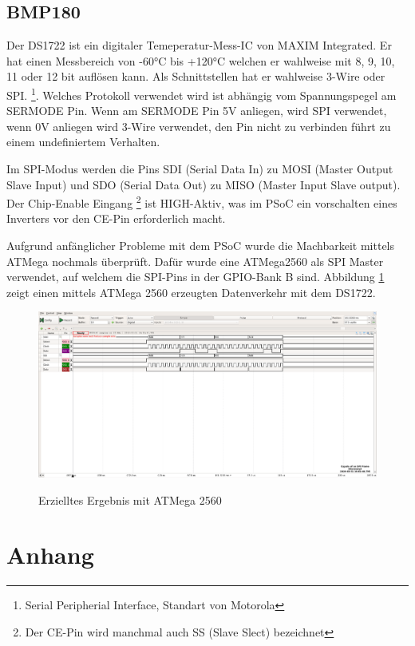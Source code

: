 \documentclass[12pt,a4paper]{article}
\begin{document}
	
\subsection{BMP180}

	Der DS1722 ist ein digitaler Temeperatur-Mess-IC von MAXIM Integrated.
	Er hat einen Messbereich von -60°C bis +120°C welchen er wahlweise mit
	8, 9, 10, 11 oder 12 bit auflösen kann. Als Schnittstellen hat er
	wahlweise 3-Wire oder SPI.
	\footnote{Serial Peripherial Interface, Standart von Motorola}. Welches
	Protokoll verwendet wird ist abhängig vom Spannungspegel am SERMODE
	Pin. Wenn am SERMODE Pin 5V anliegen, wird SPI verwendet, wenn 0V
	anliegen wird 3-Wire verwendet, den Pin nicht zu verbinden führt zu einem
	undefiniertem Verhalten.

	Im SPI-Modus werden die Pins SDI (Serial Data In) zu MOSI 
	(Master Output Slave Input) und SDO (Serial Data Out) zu MISO
	(Master Input Slave output). Der Chip-Enable Eingang
	\footnote{Der CE-Pin wird manchmal auch SS (Slave Slect) bezeichnet}
	ist HIGH-Aktiv, was im PSoC ein vorschalten eines Inverters vor den 
	CE-Pin erforderlich macht.

	Aufgrund anfänglicher Probleme mit dem PSoC wurde die Machbarkeit
	mittels ATMega nochmals überprüft. Dafür wurde eine ATMega2560
	als SPI Master verwendet, auf welchem die SPI-Pins in der GPIO-Bank B
	sind. Abbildung \ref{fig:spi_frame_atmega} zeigt einen mittels ATMega
	2560 erzeugten Datenverkehr mit dem DS1722.
	
	 
	 \begin{figure}[H]
		\centering
		\includegraphics[width=1\textwidth]
			{measurements/spi_frame_recv_atmega}
		\label{fig:spi_frame_atmega}
		\caption{Erzielltes Ergebnis mit ATMega 2560}
	\end{figure}

\section{Anhang}
\end{document}
